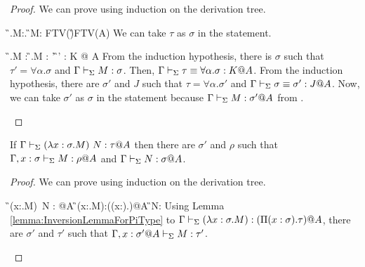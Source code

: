 \begin{proof}
    We can prove using induction on the derivation tree.
    \begin{rneqncase}{\TGen{}}{
            \G\V\Lambda\alpha.M:\forall\alpha.\tau@A
            \G\V M:\tau@A {} \alpha\notin\rm{FTV}(\G)\cup\rm{FTV}(A)}
        We can take \( \tau \) as \( \sigma \) in the statement.
    \end{rneqncase}
    \begin{rneqncase}{\TConv{}}{
            \G \V \Lambda\alpha.M : \tau
            \G \V \Lambda\alpha.M : \tau'  \G \V \tau \E \tau' : K @ A}
        From the induction hypothesis, there is \( \sigma \) such that \( \tau'
        = \forall\alpha.\sigma \) and \( \Gamma \vdash_\Sigma M : \sigma \). Then, \( \Gamma \vdash_\Sigma
        \tau \equiv \forall\alpha.\sigma : K @ A \). From the induction hypothesis,
        there are \( \sigma' \) and \( J \) such that \( \tau =
        \forall\alpha.\sigma' \) and \( \Gamma \vdash_\Sigma \sigma \equiv \sigma' : J @ A \).
        Now, we can take \( \sigma' \) as \( \sigma \) in the statement because
        \( \Gamma \vdash_\Sigma M : \sigma' @ A \) from \TConv.
    \end{rneqncase}
    \end{proof}

\begin{lemma}
    \begin{item}
    \item If $\G \V (\lambda x:\sigma.M)\ N: \tau@A$ then there are $\sigma'$ and $\rho$ such that
        $\Gamma, x:\sigma \vdash_\Sigma M : \rho @A$ and $\Gamma \vdash_\Sigma N:\sigma @ A$.
    \end{item}
\end{lemma}

\begin{proof}
    We can prove using induction on the derivation tree.
    \begin{rneqncase}{\TApp{}}{
            \G\V (\lambda x:\sigma.M)\ N : \tau[x\mapsto N]@A
            \G\V (\lambda x:\sigma.M):(\Pi (x:\sigma).\tau)@A 
            \G\V N:\sigma@A
        }
        Using Lemma \ref{lemma:InversionLemmaForPiType} to \( \Gamma\vdash_\Sigma (\lambda
        x:\sigma.M):(\Pi (x:\sigma).\tau)@A \), there are \( \sigma' \) and \(
        \tau' \) such that \( \Gamma, x:\sigma' @ A \vdash_\Sigma M : \tau' \).
    \end{rneqncase}
    \end{proof}

